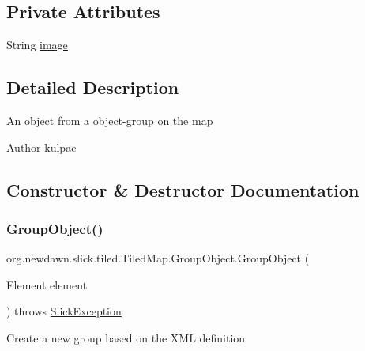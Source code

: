 \subsection*{Private Attributes}
\begin{DoxyCompactItemize}
\item 
String \mbox{\hyperlink{classorg_1_1newdawn_1_1slick_1_1tiled_1_1_tiled_map_1_1_group_object_a9a9480bd47b25ee7d59fd6ba5b242452}{image}}
\end{DoxyCompactItemize}


\subsection{Detailed Description}
An object from a object-\/group on the map

\begin{DoxyAuthor}{Author}
kulpae 
\end{DoxyAuthor}


\subsection{Constructor \& Destructor Documentation}
\mbox{\label{classorg_1_1newdawn_1_1slick_1_1tiled_1_1_tiled_map_1_1_group_object_a6c56bc60351f83f1aba8a6b25bdefa0b}} 
\subsubsection{\texorpdfstring{Group\+Object()}{GroupObject()}}
{\footnotesize\ttfamily org.\+newdawn.\+slick.\+tiled.\+Tiled\+Map.\+Group\+Object.\+Group\+Object (\begin{DoxyParamCaption}\item[{Element}]{element }\end{DoxyParamCaption}) throws \mbox{\hyperlink{classorg_1_1newdawn_1_1slick_1_1_slick_exception}{Slick\+Exception}}\hspace{0.3cm}{\ttfamily [inline]}}

Create a new group based on the X\+ML definition


